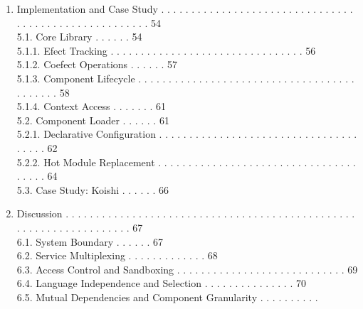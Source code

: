 \documentclass[
  10
]{article}
\begin{document}
\begin{enumerate}
  4.4. Metatheory . . . . 38\\
  4.4.1. Preservation . . . . . . . 42\\
  4.4.2. Temporal Composability . . . . . . . . . . . . . . . . . . . .
  . . . . . . . . . . . . . . . . . . . . 43\\
  4.4.3. Spatial Composability . . . . . . . . . . . . . . . . . . . . .
  . . . . . . . . . . . . . . . . . . . . . . . . . . 45\\
  4.4.4. Progress . . . . . 47\\
  4.4.5. Confluence . . . . . . . . . . . . . . 49\\
\item
  Implementation and Case Study . . . . . . . . . . . . . . . . . . . .
  . . . . . . . . . . . . . . . . . . . . . . . . . . . . . . . . . .
  54\\
  5.1. Core Library . . . . . . 54\\
  5.1.1. Efect Tracking . . . . . . . . . . . . . . . . . . . . . . . .
  . . . . . . . . 56\\
  5.1.2. Coefect Operations . . . . . . 57\\
  5.1.3. Component Lifecycle . . . . . . . . . . . . . . . . . . . . . .
  . . . . . . . . . . . . . . . . . . . . . 58\\
  5.1.4. Context Access . . . . . . . 61\\
  5.2. Component Loader . . . . . . 61\\
  5.2.1. Declarative Configuration . . . . . . . . . . . . . . . . . . .
  . . . . . . . . . . . . . . . . . . . 62\\
  5.2.2. Hot Module Replacement . . . . . . . . . . . . . . . . . . . .
  . . . . . . . . . . . . . . . . . . 64\\
  5.3. Case Study: Koishi . . . . . . 66\\
\item
  Discussion . . . . . . . . . . . . . . . . . . . . . . . . . . . . . .
  . . . . . . . . . . . . . . . . . . . . . . . . . . . . . . . . . . .
  . . 67\\
  6.1. System Boundary . . . . . . 67\\
  6.2. Service Multiplexing . . . . . . . . . . . . . 68\\
  6.3. Access Control and Sandboxing . . . . . . . . . . . . . . . . . .
  . . . . . . . . . . 69\\
  6.4. Language Independence and Selection . . . . . . . . . . . . . . .
  70\\
  6.5. Mutual Dependencies and Component Granularity . . . . . . . . . .

\end{enumerate}
\end{document}
